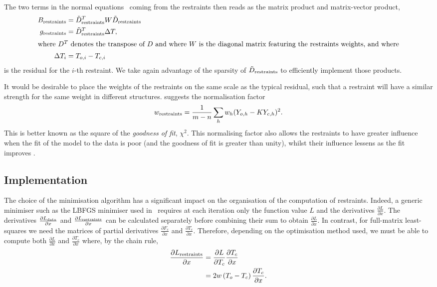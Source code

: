 \documentclass[11pt]{article}
\newcommand{\partialder}[2]{\frac{\partial #1}{\partial #2}}
\begin{document}
The two terms in the normal equations~ coming from the restraints then reads as the matrix product and matrix-vector product,
\begin{align}
B_{\text{restraints}} &= \tilde{D}_{\text{restraints}}^T W \tilde{D}_{\text{restraints}}\\
g_{\text{restraints}} &= \tilde{D}_{\text{restraints}}^T \Delta T,\\
\intertext{where $D^T$ denotes the transpose of $D$ and where $W$ is the diagonal matrix featuring the restraints weights, and where}
\Delta T_i &= T_{o,i} - T_{c,i}
\end{align}
is the residual for the $i$-th restraint. We take again advantage of the sparsity of $\tilde{D}_{\text{restraints}}$ to efficiently implement those products.

It would be desirable to place the weights of the restraints on the same scale as the typical residual, such that a restraint will have a similar strength for the same weight in different structures.  suggests the normalisation factor
\begin{align}
w_{\text{restraints}} = \frac{1}{m-n} \sum_{h}{ w_h (Y_{o,h} - K Y_{c,h})^2}.
\label{eqn:giacovazzo_normalisation}
\end{align}
This is better known as the square of the \emph{goodness of fit}, $\chi^2$. This normalising factor also allows the restraints to have greater influence when the fit of the model to the data is poor (and the goodness of fit is greater than unity), whilst their influence lessens as the fit improves \cite{Sheldrick:1997aa}.

\subsection{Implementation}

The choice of the minimisation algorithm has a significant impact on the organisation of the computation of restraints. Indeed, a generic minimiser such as the LBFGS minimiser used in \phenixrefine\ requires at each iteration only the function value $L$ and the derivatives $\partialder{L}{x}$. The derivatives $\partialder{L_\data}{x}$ and $\partialder{L_\restraints}{x}$ can be calculated separately before combining their sum to obtain $\partialder{L}{x}$. In contrast, for full-matrix least-squares we need the matrices of partial derivatives $\partialder{F_c}{x}$ and $\partialder{T_c}{x}$. Therefore, depending on the optimisation method used, we must be able to compute both $\partialder{L}{x}$ and $\partialder{T_c}{x}$ where, by the chain rule,
\begin{align}
\partialder{L_\restraints}{x} &= \partialder{L}{T_c} \partialder{T_c}{x} \nonumber\\
                             &= 2 w \left(T_o - T_c \right) \partialder{T_c}{x}.
\end{align}
\end{document}
